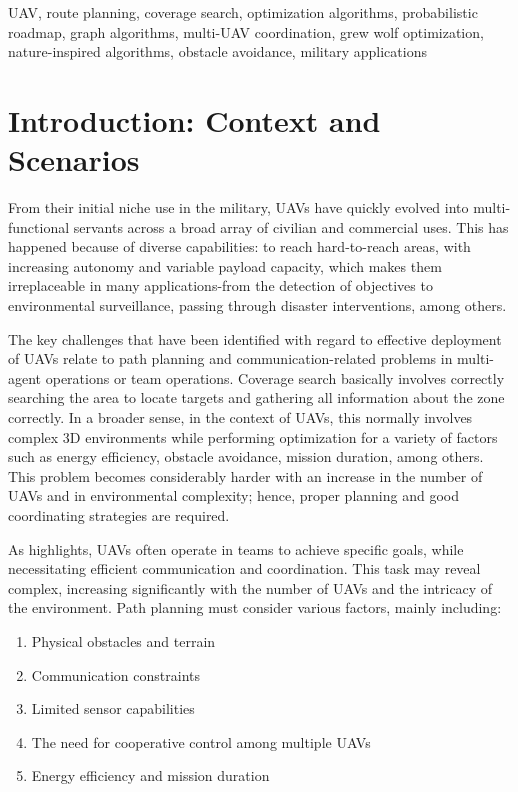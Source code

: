 \documentclass[conference]{IEEEtran}
\begin{document}
\begin{IEEEkeywords}
UAV, route planning, coverage search, optimization algorithms, probabilistic roadmap, graph algorithms, multi-UAV coordination, grew wolf optimization, nature-inspired algorithms, obstacle avoidance, military applications
\end{IEEEkeywords}

\section{Introduction: Context and Scenarios}

From their initial niche use in the military, UAVs have quickly evolved into multi-functional servants across a broad array of civilian and commercial uses. This has happened because of diverse capabilities: to reach hard-to-reach areas, with increasing autonomy and variable payload capacity, which makes them irreplaceable in many applications-from the detection of objectives to environmental surveillance, passing through disaster interventions, among others. 

The key challenges that have been identified with regard to effective deployment of UAVs relate to path planning and communication-related problems in multi-agent operations or team operations. Coverage search basically involves correctly searching the area to locate targets and gathering all information about the zone correctly. In a broader sense, in the context of UAVs, this normally involves complex 3D environments while performing optimization for a variety of factors such as energy efficiency, obstacle avoidance, mission duration, among others. This problem becomes considerably harder with an increase in the number of UAVs and in environmental complexity; hence, proper planning and good coordinating strategies are required.

As \cite{paper1} highlights, UAVs often operate in teams to achieve specific goals, while necessitating efficient communication and coordination. This task may reveal complex, increasing significantly with the number of UAVs and the intricacy of the environment. Path planning must consider various factors, mainly including:

\begin{enumerate}
    \item Physical obstacles and terrain
    \item Communication constraints
    \item Limited sensor capabilities
    \item The need for cooperative control among multiple UAVs
    \item Energy efficiency and mission duration
\end{enumerate}
\end{document}
